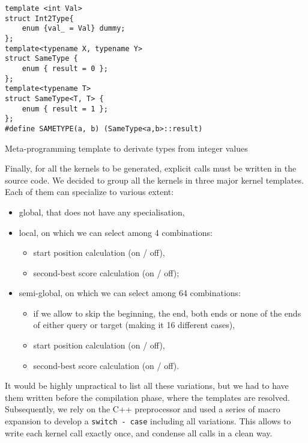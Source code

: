 \begin{listing}[h!]
	\begin{verbatim}
template <int Val>
struct Int2Type{
	enum {val_ = Val} dummy;
};
template<typename X, typename Y>
struct SameType {
	enum { result = 0 };
};
template<typename T>
struct SameType<T, T> {
	enum { result = 1 };
};
#define SAMETYPE(a, b) (SameType<a,b>::result)
	\end{verbatim}

	
	\caption{Meta-programming template to derivate types from integer values}
	\label{lst:tmp}
\end{listing}
	
Finally, for all the kernels to be generated, explicit calls must be written in the source code. We decided to group all the kernels in three major kernel templates. Each of them can specialize to various extent:

\begin{itemize}
	\item global, that does not have any specialisation,
	\item local, on which we can select among 4 combinations:
	\begin{itemize}
		\item start position calculation (on / off),
		\item second-best score calculation (on / off);
	\end{itemize}
	\item semi-global, on which we can select among 64 combinations:
	\begin{itemize}
		\item if we allow to skip the beginning, the end, both ends or none of the ends of either query or target (making it 16 different cases),
		\item start position calculation (on / off),
		\item second-best score calculation (on / off).
	\end{itemize}
\end{itemize}

It would be highly unpractical to list all these variations, but we had to have them written before the compilation phase, where the templates are resolved. Subsequently, we rely on the C++ preprocessor and used a series of macro expansion to develop a \verb|switch - case| including all variations. This allows to write each kernel call exactly once, and condense all calls in a clean way.

